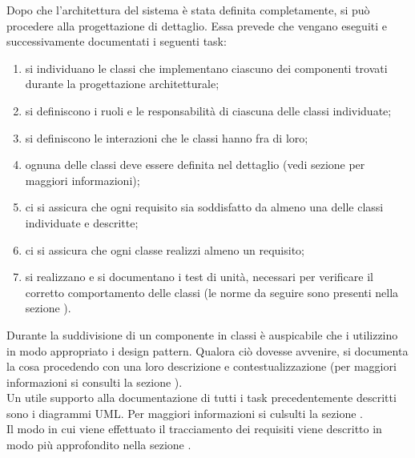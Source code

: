 			Dopo che l'architettura del sistema è stata definita completamente, si può procedere alla progettazione di dettaglio. Essa prevede che vengano eseguiti e successivamente documentati i seguenti task:
			\begin{enumerate}
				\item si individuano le classi che implementano ciascuno dei componenti trovati durante la progettazione architetturale;
				\item si definiscono i ruoli e le responsabilità di ciascuna delle classi individuate;
				\item si definiscono le interazioni che le classi hanno fra di loro;
				\item ognuna delle classi deve essere definita nel dettaglio (vedi sezione  per maggiori informazioni);
				\item ci si assicura che ogni requisito sia soddisfatto da almeno una delle classi individuate e descritte;
				\item ci si assicura che ogni classe realizzi almeno un requisito;
				\item si realizzano e si documentano i test di unità, necessari per verificare il corretto comportamento delle classi (le norme da seguire sono presenti nella sezione ).
			\end{enumerate}
			Durante la suddivisione di un componente in classi è auspicabile che i  utilizzino in modo appropriato i design pattern. Qualora ciò dovesse avvenire, si documenta la cosa procedendo con una loro descrizione e contestualizzazione (per maggiori informazioni si consulti la sezione ).\\
			Un utile supporto alla documentazione di tutti i task precedentemente descritti sono i diagrammi UML. Per maggiori informazioni si culsulti la sezione .\\
			Il modo in cui viene effettuato il tracciamento dei requisiti viene descritto in modo più approfondito nella sezione .

